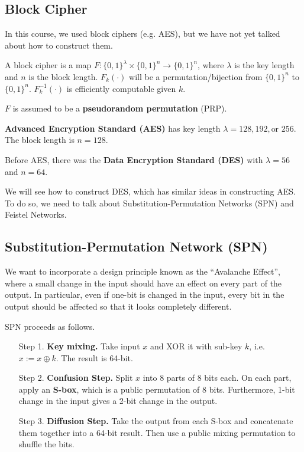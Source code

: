 \subsection{Block Cipher}

In this course, we used block ciphers (e.g. AES), but we have not yet talked about how to construct them.

\begin{definition}
    A block cipher is a map $F: \{0, 1\} ^\lambda \times \{ 0 , 1\} ^n \to \{ 0, 1 \}^n$, where $\lambda$ is the key length and $n$ is the block length. $F_k(\cdot)$ will be a permutation/bijection from $\{0, 1\}^n$ to $\{0, 1\}^n$. $F_k^{-1}(\cdot)$ is efficiently computable given $k$.
    
    $F$ is assumed to be a \textbf{pseudorandom permutation} (PRP).
\end{definition}

\begin{example}
    \textbf{Advanced Encryption Standard (AES)} has key length $\lambda = 128, 192, \text{or }256$. The block length is $n=128$.
    
    Before AES, there was the \textbf{Data Encryption Standard (DES)} with $\lambda = 56$ and $n =64$.
\end{example}

We will see how to construct DES, which has similar ideas in constructing AES. To do so, we need to talk about Substitution-Permutation Networks (SPN) and Feistel Networks.

\subsection{Substitution-Permutation Network (SPN)}

We want to incorporate a design principle known as the ``Avalanche Effect'', where a small change in the input should have an effect on every part of the output. In particular, even if one-bit is changed in the input, every bit in the output should be affected so that it looks completely different.

SPN proceeds as follows.

\begin{enumerate}
    \item[Step 1.] \textbf{Key mixing.} Take input $x$ and XOR it with sub-key $k$, i.e. $x:= x \oplus k$. The result is 64-bit.
    \item[Step 2.] \textbf{Confusion Step.} Split $x$ into $8$ parts of 8 bits each. On each part, apply an \textbf{S-box}, which is a public permutation of 8 bits. Furthermore, 1-bit change in the input gives a 2-bit change in the output.
    \item[Step 3.] \textbf{Diffusion Step.} Take the output from each S-box and concatenate them together into a 64-bit result. Then use a public mixing permutation to shuffle the bits.
\end{enumerate}

